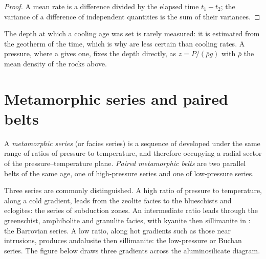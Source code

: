 \begin{proof}
A mean rate is a difference divided by the elapsed time $t_1 - t_2$; the variance of a
difference of independent quantities is the sum of their variances.
\end{proof}

The depth at which a cooling age was set is rarely measured: it is estimated from the
geotherm of the time, which is why  are less certain than cooling rates.
A pressure, where a  gives one, fixes the depth directly, as
$z = P/(\bar\rho g)$ with $\bar\rho$ the mean density of the rocks above.

\section{Metamorphic series and paired belts}\label{sec:b2:pt-paths:series}

\begin{definition}\label{def:b2:pt-paths:series}
A \emph{metamorphic series} (or facies series) is a sequence of
 developed under the same range of ratios of pressure to temperature,
and therefore occupying a radial sector of the pressure--temperature plane.
\emph{Paired metamorphic belts} are two parallel belts of
the same age, one of high-pressure series and one of low-pressure series.
\end{definition}

Three series are commonly distinguished. A high ratio of pressure to temperature, along a
cold gradient, leads from the zeolite facies to the blueschists and eclogites: the series
of subduction zones. An intermediate ratio leads through the greenschist, amphibolite and
granulite facies, with kyanite then sillimanite in : the Barrovian series. A low
ratio, along hot gradients such as those near intrusions, produces andalusite then
sillimanite: the low-pressure or Buchan series. The figure below draws three gradients
across the aluminosilicate diagram.


